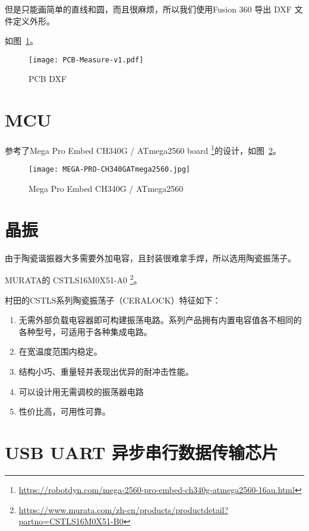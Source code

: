 但是只能画简单的直线和圆，而且很麻烦，所以我们使用Fusion 360 导出 DXF 文件定义外形。

如图~\ref{fig:PCB-Measure-v1}。

\begin{figure}[htbp]
    \centering
    \texttt{[image: PCB-Measure-v1.pdf]}
    \caption{PCB DXF}
    \label{fig:PCB-Measure-v1}
\end{figure}



\section{MCU}

参考了Mega Pro Embed CH340G / ATmega2560 board \footnote{\url{https://robotdyn.com/mega-2560-pro-embed-ch340g-atmega2560-16au.html}}的设计，如图~\ref{fig:MEGA-PRO-CH340GATmega2560}。

\begin{figure}[htbp]
    \centering
    \texttt{[image: MEGA-PRO-CH340GATmega2560.jpg]}
    \caption{Mega Pro Embed CH340G / ATmega2560}
    \label{fig:MEGA-PRO-CH340GATmega2560}
\end{figure}


\section{晶振}

由于陶瓷谐振器大多需要外加电容，且封装很难拿手焊，所以选用陶瓷振荡子。

MURATA的 CSTLS16M0X51-A0 \footnote{\url{https://www.murata.com/zh-cn/products/productdetail?partno=CSTLS16M0X51-B0}}。

村田的CSTLS系列陶瓷振荡子（CERALOCK）特征如下：

\begin{enumerate}
    \item 无需外部负载电容器即可构建振荡电路。系列产品拥有内置电容值各不相同的各种型号，可适用于各种集成电路。
    \item 在宽温度范围内稳定。
    \item 结构小巧、重量轻并表现出优异的耐冲击性能。
    \item 可以设计用无需调校的振荡器电路
    \item 性价比高，可用性可靠。
\end{enumerate}



\section{USB UART 异步串行数据传输芯片}

